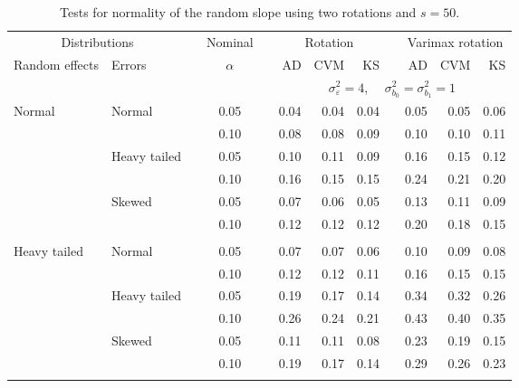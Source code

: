 \begin{table}[ht]
\caption{\label{tab:simb150}Tests for normality of the random slope using two rotations and $s = 50$.}
\begin{scriptsize}
\begin{center}
\begin{tabular}{ll p{.1cm} c p{.1cm} rrr p{.1cm} rrr}
  \hline
  \multicolumn{2}{c}{Distributions}& & Nominal & &  \multicolumn{3}{c}{Rotation} & & \multicolumn{3}{c}{Varimax rotation} \\ \cline{1-2} \cline{6-8} \cline{10-12}   
  Random effects & Errors & & $\alpha$ & & AD & CVM & KS & & AD & CVM & KS \\ 
   \hline
& && && \multicolumn{7}{c}{$\sigma_{\varepsilon}^2 = 4$, \ \ $\sigma_{b_0}^2 = \sigma_{b_1}^2 = 1$} \\ \cline{6-12}
\rowcolor{gray!20}Normal       & Normal       && 0.05 &&  0.04 & 0.04 & 0.04 && 0.05 & 0.05 & 0.06 \\ 
\rowcolor{gray!20}             &              && 0.10 &&  0.08 & 0.08 & 0.09 && 0.10 & 0.10 & 0.11 \\ 
\rowcolor{gray!20}             & Heavy tailed && 0.05 &&  0.10 & 0.11 & 0.09 && 0.16 & 0.15 & 0.12 \\ 
\rowcolor{gray!20}             &              && 0.10 &&  0.16 & 0.15 & 0.15 && 0.24 & 0.21 & 0.20 \\ 
\rowcolor{gray!20}             & Skewed       && 0.05 &&  0.07 & 0.06 & 0.05 && 0.13 & 0.11 & 0.09 \\ 
\rowcolor{gray!20}             &              && 0.10 &&  0.12 & 0.12 & 0.12 && 0.20 & 0.18 & 0.15 \\ 
             &&&&&&&&&&&\\
Heavy tailed & Normal       && 0.05 &&  0.07 & 0.07 & 0.06 && 0.10 & 0.09 & 0.08 \\ 
             &              && 0.10 &&  0.12 & 0.12 & 0.11 && 0.16 & 0.15 & 0.15 \\ 
             & Heavy tailed && 0.05 &&  0.19 & 0.17 & 0.14 && 0.34 & 0.32 & 0.26 \\ 
             &              && 0.10 &&  0.26 & 0.24 & 0.21 && 0.43 & 0.40 & 0.35 \\ 
             & Skewed       && 0.05 &&  0.11 & 0.11 & 0.08 && 0.23 & 0.19 & 0.15 \\ 
             &              && 0.10 &&  0.19 & 0.17 & 0.14 && 0.29 & 0.26 & 0.23 \\ 
             &&&&&&&&&&&\\

\end{tabular}
\end{center}
\end{scriptsize}
\end{table}
